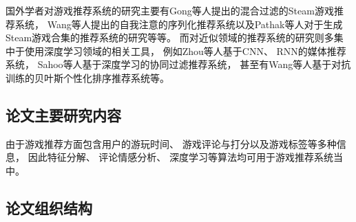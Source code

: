 国外学者对游戏推荐系统的研究主要有Gong等人\cite{gongHybridRecommenderSystem2020}提出的混合过滤的Steam游戏推荐系统，
Wang\cite{kangSelfAttentiveSequentialRecommendation2018}等人提出的自我注意的序列化推荐系统以及Pathak\cite{pathakGeneratingPersonalizingBundle2017}等人对于生成Steam游戏合集的推荐系统的研究等等。
而对近似领域的推荐系统的研究则多集中于使用深度学习领域的相关工具，
例如Zhou\cite{zhouCNNRNNBasedIntelligent2021}等人基于CNN、
RNN的媒体推荐系统，
Sahoo\cite{sahooDeepRecoDeepLearning2019}等人基于深度学习的协同过滤推荐系统，
甚至有Wang\cite{wangAdversarialTrainingBasedMean2020}等人基于对抗训练的贝叶斯个性化排序推荐系统等。

\subsection{论文主要研究内容}

由于游戏推荐方面包含用户的游玩时间、
游戏评论与打分以及游戏标签等多种信息，
因此特征分解、
评论情感分析、
深度学习等算法均可用于游戏推荐系统当中。

\subsection{论文组织结构}
